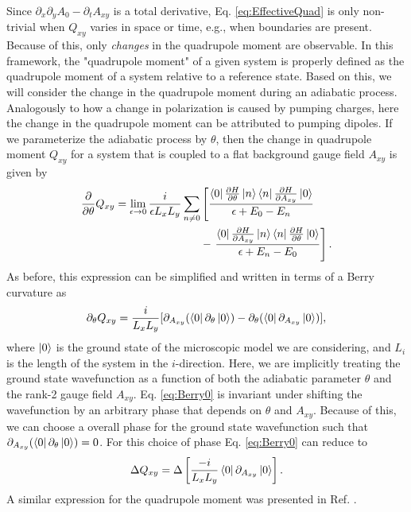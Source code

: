 \documentclass[prb,aps,twocolumn,groupaddress,floatfix]{revtex4-1}
\begin{document}
Since $\partial_x \partial_yA_{0} - \partial_t A_{xy} $ is a total derivative, Eq. \ref{eq:EffectiveQuad} is only non-trivial when $Q_{xy}$ varies in space or time, e.g.,  when boundaries are present. Because of this, only \textit{changes} in the quadrupole moment are observable. In this framework, the "quadrupole moment" of a given system is properly defined as the quadrupole moment of a system relative to a reference state. Based on this, we will consider the change in the quadrupole moment during an adiabatic process.  Analogously to how a change in polarization is caused by pumping charges, here the change in the quadrupole moment can be attributed to pumping dipoles. If we parameterize the adiabatic process by $\theta$, then the change in quadrupole moment $Q_{xy}$ for a system that is coupled to a flat background gauge field $A_{xy}$ is given by
\begin{equation}
\begin{split}
\frac{\partial}{\partial \theta} Q_{xy} = \lim_{\epsilon \rightarrow 0}\frac{i}{\epsilon L_x L_y}\sum_{n\neq 0}&\left[\frac{\bra{0} \frac{\partial H}{\partial\theta}\ket{n}\bra{n} \frac{\partial H}{\partial{A_{xy}}} \ket{0}}{\epsilon + E_0 - E_n}\right. \\ & - \left. \frac{\bra{0} \frac{\partial H}{\partial{A_{xy}}}\ket{n}\bra{n} \frac{\partial H}{\partial\theta} \ket{0}}{\epsilon + E_n - E_0}\right]. \label{eq:KuboSpectralQuad}
\end{split}
\end{equation}
As before, this expression can be simplified and written in terms of a Berry curvature as
\begin{equation}
\partial_\theta Q_{xy} = \frac{i}{L_x L_y} [\partial_{A_{xy}}(\bra{0}\partial_{\theta} \ket{0}) -  \partial_{\theta}(\bra{0}\partial_{A_{xy}} \ket{0})],
\label{eq:Berry0}
\end{equation}
where $\ket{0}$ is the ground state of the microscopic model we are considering, and $L_i$ is the length of the system in the $i$-direction. Here, we are implicitly treating the ground state wavefunction as a function of both the adiabatic parameter $\theta$ and the rank-2 gauge field $A_{xy}$. Eq. \ref{eq:Berry0}  is invariant under shifting the wavefunction by an arbitrary phase that depends on $\theta$ and $A_{xy}$. Because of this, we can choose a overall phase for the ground state wavefunction such that $\partial_{A_{xy}}(\bra{0}\partial_{\theta} \ket{0}) = 0$. For this choice of phase Eq. \ref{eq:Berry0} can reduce to 
\begin{equation}
\Delta Q_{xy} = \Delta\left[\frac{-i}{L_x L_y} \bra{0}\partial_{A_{xy}} \ket{0}\right].
\label{eq:Berry1}
\end{equation} A similar expression for the quadrupole moment was presented in Ref. . 
\end{document}
